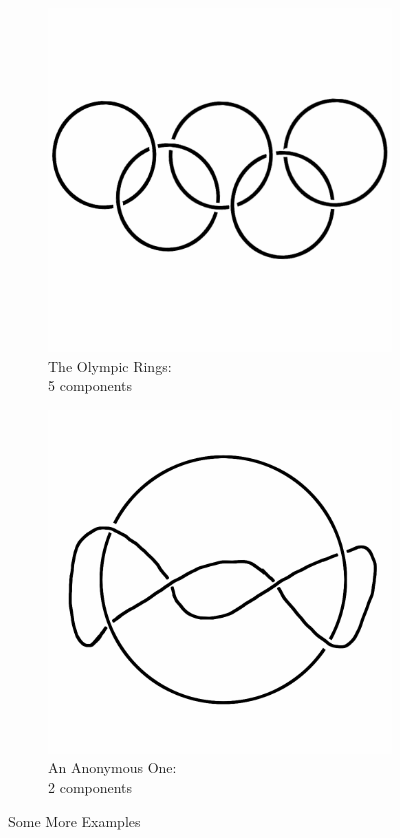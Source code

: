 \documentclass[12pt,letterpaper]{article}
\theoremstyle{definition}
\begin{document}
\begin{figure}[h]
\begin{subfigure}{.3\textwidth}
        \includegraphics[width=\textwidth]{rgp10pics/olympic.png}
        \caption{The Olympic Rings:\\ \phantom{space} 5 components}
    \end{subfigure}
    \quad
    \begin{subfigure}{.3\textwidth}
        \centering
        \includegraphics[width=\textwidth]{rgp10pics/saturntwist.png}
        \caption{An Anonymous One:\\ \phantom{space} 2 components}
    \end{subfigure}
    \caption{Some More Examples}
\end{figure}
\end{document}

